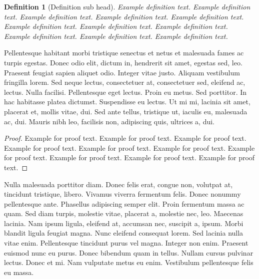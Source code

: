 \documentclass{wber}
\newtheorem{definition}{Definition}
\begin{document}
\begin{definition}[Definition sub head]
Example definition text. Example definition text. Example definition text. Example definition text. Example definition text. Example definition text. Example definition text. Example definition text. Example definition text. Example definition text. Example definition text.
\end{definition}

Pellentesque habitant morbi tristique senectus et netus et malesuada fames ac turpis egestas. Donec odio elit,
dictum in, hendrerit sit amet, egestas sed, leo. Praesent feugiat sapien aliquet odio. Integer vitae justo. Aliquam
vestibulum fringilla lorem. Sed neque lectus, consectetuer at, consectetuer sed, eleifend ac, lectus. Nulla facilisi.
Pellentesque eget lectus. Proin eu metus. Sed porttitor. In hac habitasse platea dictumst. Suspendisse eu lectus. Ut
mi mi, lacinia sit amet, placerat et, mollis vitae, dui. Sed ante tellus, tristique ut, iaculis eu, malesuada ac, dui.
Mauris nibh leo, facilisis non, adipiscing quis, ultrices a, dui.

\begin{proof}
Example for proof text. Example for proof text. Example for proof text. Example for proof text. Example for proof text. Example for proof text. Example for proof text. Example for proof text. Example for proof text. Example for proof text. 
\end{proof}

Nulla malesuada porttitor diam. Donec felis erat, congue non, volutpat at, tincidunt tristique, libero. Vivamus
viverra fermentum felis. Donec nonummy pellentesque ante. Phasellus adipiscing semper elit. Proin fermentum massa
ac quam. Sed diam turpis, molestie vitae, placerat a, molestie nec, leo. Maecenas lacinia. Nam ipsum ligula, eleifend
at, accumsan nec, suscipit a, ipsum. Morbi blandit ligula feugiat magna. Nunc eleifend consequat lorem. Sed lacinia
nulla vitae enim. Pellentesque tincidunt purus vel magna. Integer non enim. Praesent euismod nunc eu purus. Donec
bibendum quam in tellus. Nullam cursus pulvinar lectus. Donec et mi. Nam vulputate metus eu enim. Vestibulum
pellentesque felis eu massa.
\end{document}
